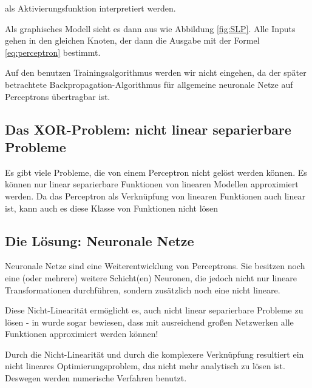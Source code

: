 als Aktivierungsfunktion interpretiert werden.

Als graphisches Modell sieht es dann aus wie Abbildung \ref{fig:SLP}. Alle Inputs gehen in den gleichen Knoten, der dann die Ausgabe mit der Formel \ref{eq:perceptron} bestimmt. 

Auf den benutzen Trainingsalgorithmus werden wir nicht eingehen, da der später betrachtete Backpropagation-Algorithmus für allgemeine neuronale Netze auf Perceptrons übertragbar ist.

\subsection{Das XOR-Problem: nicht linear separierbare Probleme}
Es gibt viele Probleme, die von einem Perceptron nicht gelöst werden können. Es können nur linear separierbare Funktionen von linearen Modellen approximiert werden. Da das Perceptron als Verknüpfung von linearen Funktionen auch linear ist, kann auch es diese Klasse von Funktionen nicht lösen

\subsection{Die Lösung: Neuronale Netze}
Neuronale Netze sind eine Weiterentwicklung von Perceptrons. Sie besitzen noch eine (oder mehrere) weitere Schicht(en) Neuronen, die jedoch nicht nur lineare Transformationen durchführen, sondern zusätzlich noch eine nicht lineare.

Diese Nicht-Linearität ermöglicht es, auch nicht linear separierbare Probleme zu lösen - in \cite{cybenko1989approximation} wurde sogar bewiesen, dass mit ausreichend großen Netzwerken alle Funktionen approximiert werden können!

Durch die Nicht-Linearität und durch die komplexere Verknüpfung resultiert ein nicht lineares Optimierungsproblem, das nicht mehr analytisch zu lösen ist. Deswegen werden numerische Verfahren benutzt.


